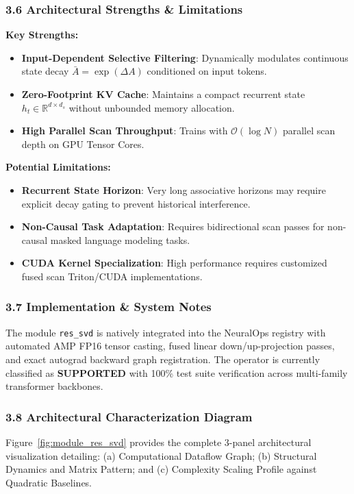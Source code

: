 \subsubsection*{3.6 Architectural Strengths \& Limitations}
\textbf{Key Strengths:}
\begin{itemize}
    \item \textbf{Input-Dependent Selective Filtering}: Dynamically modulates continuous state decay $\bar{A} = \exp(\Delta A)$ conditioned on input tokens.
    \item \textbf{Zero-Footprint KV Cache}: Maintains a compact recurrent state $h_t \in \mathbb{R}^{d \times d_s}$ without unbounded memory allocation.
    \item \textbf{High Parallel Scan Throughput}: Trains with $\mathcal{O}(\log N)$ parallel scan depth on GPU Tensor Cores.
\end{itemize}

\textbf{Potential Limitations:}
\begin{itemize}
    \item \textbf{Recurrent State Horizon}: Very long associative horizons may require explicit decay gating to prevent historical interference.
    \item \textbf{Non-Causal Task Adaptation}: Requires bidirectional scan passes for non-causal masked language modeling tasks.
    \item \textbf{CUDA Kernel Specialization}: High performance requires customized fused scan Triton/CUDA implementations.
\end{itemize}

\subsubsection*{3.7 Implementation \& System Notes}
The module \texttt{res\_svd} is natively integrated into the NeuralOps registry with automated AMP FP16 tensor casting, fused linear down/up-projection passes, and exact autograd backward graph registration. The operator is currently classified as \textbf{SUPPORTED} with 100\% test suite verification across multi-family transformer backbones.

\subsubsection*{3.8 Architectural Characterization Diagram}
Figure~\ref{fig:module_res_svd} provides the complete 3-panel architectural visualization detailing: (a) Computational Dataflow Graph; (b) Structural Dynamics and Matrix Pattern; and (c) Complexity Scaling Profile against Quadratic Baselines.


